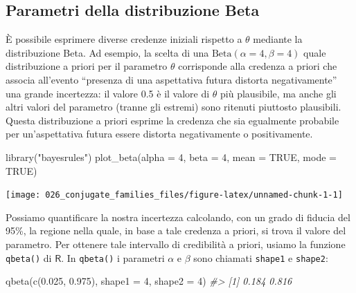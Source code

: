 \documentclass[
  10pt,
  italian,
  a4paper,
  extrafontsizes,onecolumn,openright
  ]{memoir}
\newenvironment{Shaded}{\begin{snugshade}}{\end{snugshade}}
\newcommand{\AttributeTok}[1]{\textcolor[rgb]{0.77,0.63,0.00}{#1}}
\newcommand{\CommentTok}[1]{\textcolor[rgb]{0.56,0.35,0.01}{\textit{#1}}}
\newcommand{\ConstantTok}[1]{\textcolor[rgb]{0.00,0.00,0.00}{#1}}
\newcommand{\DecValTok}[1]{\textcolor[rgb]{0.00,0.00,0.81}{#1}}
\newcommand{\FloatTok}[1]{\textcolor[rgb]{0.00,0.00,0.81}{#1}}
\newcommand{\FunctionTok}[1]{\textcolor[rgb]{0.00,0.00,0.00}{#1}}
\newcommand{\NormalTok}[1]{#1}
\newcommand{\StringTok}[1]{\textcolor[rgb]{0.31,0.60,0.02}{#1}}
\newcommand{\R}{\textsf{R}} %
\theoremstyle{definition}
\theoremstyle{definition}
\theoremstyle{definition}
\theoremstyle{definition}
\theoremstyle{remark}
\begin{document}
\hypertarget{parametri-della-distribuzione-beta}{%
\subsection{Parametri della distribuzione Beta}\label{parametri-della-distribuzione-beta}}

È possibile esprimere diverse credenze iniziali rispetto a \(\theta\) mediante la distribuzione Beta. Ad esempio, la scelta di una \(\mbox{Beta}(\alpha = 4, \beta = 4)\) quale distribuzione a priori per il parametro \(\theta\) corrisponde alla credenza a priori che associa all'evento ``presenza di una aspettativa futura distorta negativamente'' una grande incertezza: il valore 0.5 è il valore di \(\theta\) più plausibile, ma anche gli altri valori del parametro (tranne gli estremi) sono ritenuti piuttosto plausibili. Questa distribuzione a priori esprime la credenza che sia egualmente probabile per un'aspettativa futura essere distorta negativamente o positivamente.

\begin{Shaded}
\begin{Highlighting}[]
\FunctionTok{library}\NormalTok{(}\StringTok{"bayesrules"}\NormalTok{)}
\FunctionTok{plot\_beta}\NormalTok{(}\AttributeTok{alpha =} \DecValTok{4}\NormalTok{, }\AttributeTok{beta =} \DecValTok{4}\NormalTok{, }\AttributeTok{mean =} \ConstantTok{TRUE}\NormalTok{, }\AttributeTok{mode =} \ConstantTok{TRUE}\NormalTok{)}
\end{Highlighting}
\end{Shaded}

\begin{center}\texttt{[image: 026\_conjugate\_families\_files/figure-latex/unnamed-chunk-1-1]} \end{center}

Possiamo quantificare la nostra incertezza calcolando, con un grado di fiducia del 95\%, la regione nella quale, in base a tale credenza a priori, si trova il valore del parametro. Per ottenere tale intervallo di credibilità a priori, usiamo la funzione \texttt{qbeta()} di \(\R\). In \texttt{qbeta()} i parametri \(\alpha\) e \(\beta\) sono chiamati \texttt{shape1} e \texttt{shape2}:

\begin{Shaded}
\begin{Highlighting}[]
\FunctionTok{qbeta}\NormalTok{(}\FunctionTok{c}\NormalTok{(}\FloatTok{0.025}\NormalTok{, }\FloatTok{0.975}\NormalTok{), }\AttributeTok{shape1 =} \DecValTok{4}\NormalTok{, }\AttributeTok{shape2 =} \DecValTok{4}\NormalTok{)}
\CommentTok{\#\textgreater{} [1] 0.184 0.816}
\end{Highlighting}
\end{Shaded}
\end{document}
